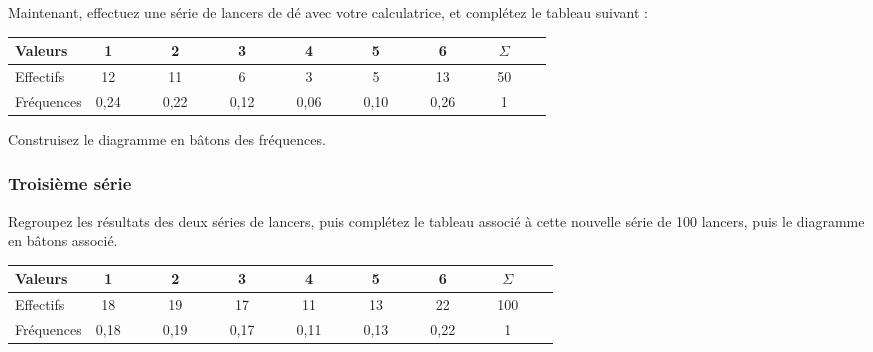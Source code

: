 Maintenant, effectuez une série de lancers de dé avec votre calculatrice, et complétez le tableau suivant :

\begin{tabular}{|l|ccc|ccc|ccc|ccc|ccc|ccc|ccc|}
\hline
Valeurs & 1 & & & 2 & & & 3 & & & 4 & & & 5 & & & 6 & & & $\Sigma$ & &  \\
\hline
Effectifs & 12 & & & 11 & & & 6 & & & 3 & & & 5 & & & 13 & & & 50 & & \\
\hline
Fréquences & 0,24 & & & 0,22 & & & 0,12 & & & 0,06 & & & 0,10 & & & 0,26 & & & 1 & & \\
\hline
\end{tabular}

\vspace*{.3cm}

Construisez le diagramme en bâtons des fréquences.

\begin{center}


\end{center}

\newpage

\subsubsection*{Troisième série}

Regroupez les résultats des deux séries de lancers, puis complétez le tableau associé à cette nouvelle série de 100 lancers, puis le diagramme en bâtons associé.\\

\begin{tabular}{|l|ccc|ccc|ccc|ccc|ccc|ccc|ccc|}
\hline
Valeurs & 1 & & & 2 & & & 3 & & & 4 & & & 5 & & & 6 & & & $\Sigma$ & &  \\
\hline
Effectifs & 18 & & & 19 & & & 17 & & & 11 & & & 13 & & & 22 & & & 100 & & \\
\hline
Fréquences & 0,18 & & & 0,19 & & & 0,17 & & & 0,11 & & & 0,13 & & & 0,22 & & & 1 & & \\
\hline
\end{tabular}

